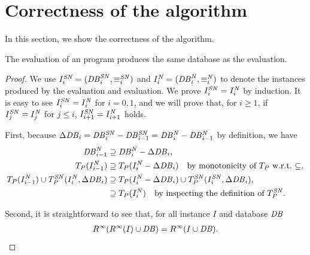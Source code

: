 \section{Correctness of the \seminaive algorithm}\label{sec:sn-proof}

In this section, we show the correctness of the \seminaive algorithm.

\begin{theorem}
    The \seminaive evaluation of an \egglog program
    produces the same database as the \naive
    evaluation.
\end{theorem}
\begin{proof}
    We use $I^{\mathit{SN}}_i=(\mathit{DB}^{\mathit{SN}}_i, \equiv^{\mathit{SN}}_i)$ and $I^{\mathit{N}}_i=(\mathit{DB}^{\mathit{N}}_i, \equiv^{\mathit{N}}_i)$ 
    to denote the instances 
    produced by the \seminaive evaluation
    and \naive evaluation.   
    We prove $I^{\mathit{SN}}_i=I^{\mathit{N}}_i$ by induction. 
    It is easy to see $I^{\mathit{SN}}_i=I^{\mathit{N}}_i$ for $i=0, 1$,
    and we will prove that, for $i\geq 1$,
    if $I^{\mathit{SN}}_j=I^{\mathit{N}}_j$ for $j\leq i$, $I^{\mathit{SN}}_{i+1}=I^{\mathit{N}}_{i+1}$ holds.

    First, because $\Delta\mathit{DB}{}_i = \mathit{DB}{}^{\mathit{SN}}_{i} - \mathit{DB}{}^{\mathit{SN}}_{i-1} = \mathit{DB}{}^{\mathit{N}}_{i} - \mathit{DB}{}^{\mathit{N}}_{i-1}$ by definition,
    we have \begin{align}
        \mathit{DB}^{\mathit{N}}_{i-1}&\supseteq \mathit{DB}^{\mathit{N}}_i - \Delta\mathit{DB}_i,\\
        T_P(I^{\mathit{N}}_{i-1})&\supseteq T_P(I^{\mathit{N}}_i - \Delta\mathit{DB}_i)\text{\quad by monotonicity of $T_P$ w.r.t.\ $\subseteq$},\\
        T_P(I^{\mathit{N}}_{i-1})\cup T_P^{\mathit{SN}}(I^{\mathit{N}}_i, \Delta\mathit{DB}_i)
        &\supseteq T_P(I^{\mathit{N}}_i - \Delta\mathit{DB}_i)\cup T_P^{\mathit{SN}}(I^{\mathit{SN}}_i, \Delta\mathit{DB}_i), \\
        &\supseteq T_P(I^{\mathit{N}}_i) \text{\quad by inspecting the definition of $T^{\mathit{SN}}_P$.}\label{eqn:l1}
    \end{align}

    Second, it is straightforward to see that, for all instance $I$ and database $\mathit{DB}$
    \begin{align}
        R^\infty (R^\infty(I)\cup \mathit{DB}) = R^\infty (I\cup \mathit{DB}) \label{eqn:l2}.
    \end{align}


\end{proof}

